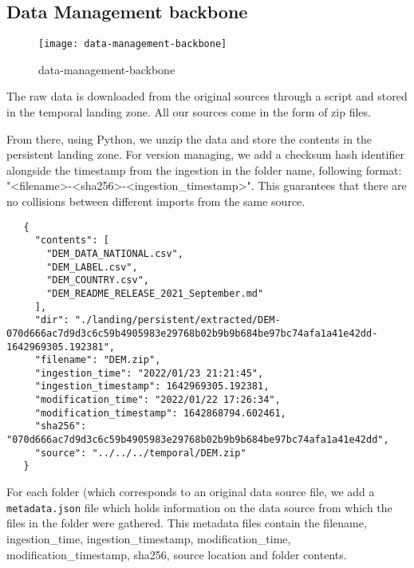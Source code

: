 

\begin{landscape}
\section{Data Management backbone}
\begin{figure}[H]
    \texttt{[image: data-management-backbone]}
    \caption{data-management-backbone}
\end{figure}
\end{landscape}

The raw data is downloaded from the original sources through a script and stored in the temporal
landing zone. All our sources come in the form of zip files.

From there, using Python, we unzip the data and store the contents in the persistent landing zone.
For version managing, we add a checksum hash identifier alongside the timestamp from the ingestion in the folder name, following format: "<filename>-<sha256>-<ingestion\_timestamp>". This guarantees that there
are no collisions between different imports from the same source.

\begin{verbatim}
   {
     "contents": [
       "DEM_DATA_NATIONAL.csv",
       "DEM_LABEL.csv",
       "DEM_COUNTRY.csv",
       "DEM_README_RELEASE_2021_September.md"
     ],
     "dir": "./landing/persistent/extracted/DEM-070d666ac7d9d3c6c59b4905983e29768b02b9b9b684be97bc74afa1a41e42dd-1642969305.192381",
     "filename": "DEM.zip",
     "ingestion_time": "2022/01/23 21:21:45",
     "ingestion_timestamp": 1642969305.192381,
     "modification_time": "2022/01/22 17:26:34",
     "modification_timestamp": 1642868794.602461,
     "sha256": "070d666ac7d9d3c6c59b4905983e29768b02b9b9b684be97bc74afa1a41e42dd",
     "source": "../../../temporal/DEM.zip"
   }
\end{verbatim}

For each folder (which corresponds to an original data source file, we add a \texttt{metadata.json} file
which holds information on the data source from which the files in the folder were gathered.
This metadata files contain the filename, ingestion\_time, ingestion\_timestamp,
modification\_time, modification\_timestamp, sha256, source location and folder contents.

